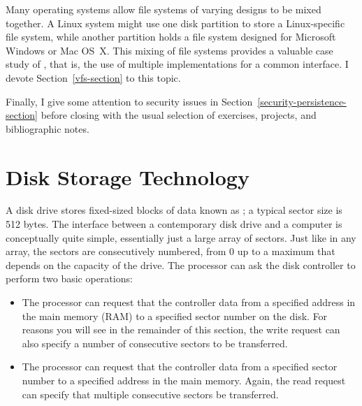 Many operating systems allow file systems of varying designs to be
mixed together.  A Linux system might use one disk
partition to store a Linux-specific file system, while another
partition holds a file system designed for Microsoft Windows or Mac
OS~X.  This mixing of file systems provides a valuable case study of
, that is, the use of multiple implementations for a
common interface.  I devote
Section~\ref{vfs-section} to this topic.

Finally, I give some attention to security issues in Section~\ref{security-persistence-section} before closing
with the usual selection of exercises, projects, and bibliographic
notes.

\section{Disk Storage Technology}\label{disk-storage-technology-section}

A disk drive stores fixed-sized blocks of data known as
; a typical sector size is 512 bytes.  The interface
between a contemporary disk drive and a computer is conceptually quite
simple, essentially just a large array of sectors.  Just like in any
array, the sectors are consecutively numbered, from 0 up to a maximum
that depends on the capacity of the drive.  The processor can ask the
disk controller to perform two basic operations:
\begin{itemize}
\item
The processor can request that the controller  data from a specified address in the
main memory (RAM) to a specified sector number on the
disk.  For reasons you will see in the remainder of this section, the write request can also
specify a number of consecutive sectors to be transferred.
\item
The processor can request that the controller  data from a specified sector number to a specified
address in the main memory.  Again, the
read request can specify that multiple consecutive sectors be
transferred.
\end{itemize}

